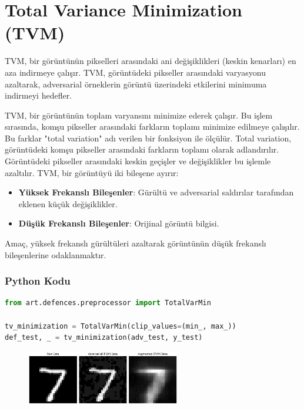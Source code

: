 \section{Total Variance Minimization (TVM)}

TVM, bir görüntünün pikselleri arasındaki ani değişiklikleri (keskin kenarları) en aza indirmeye çalışır. TVM, görüntüdeki pikseller arasındaki varyasyonu azaltarak, adversarial örneklerin görüntü üzerindeki etkilerini minimuma indirmeyi hedefler. 

TVM, bir görüntünün toplam varyansını minimize ederek çalışır. Bu işlem sırasında, komşu pikseller arasındaki farkların toplamı minimize edilmeye çalışılır. Bu farklar "total variation" adı verilen bir fonksiyon ile ölçülür. Total variation, görüntüdeki komşu pikseller arasındaki farkların toplamı olarak adlandırılır. Görüntüdeki pikseller arasındaki keskin geçişler ve değişiklikler bu işlemle azaltılır. TVM, bir görüntüyü iki bileşene ayırır:

\begin{itemize}
    \item \textbf{Yüksek Frekanslı Bileşenler}: Gürültü ve adversarial saldırılar tarafından eklenen küçük değişiklikler.
    \item \textbf{Düşük Frekanslı Bileşenler}: Orijinal görüntü bilgisi.
\end{itemize}

Amaç, yüksek frekanslı gürültüleri azaltarak görüntünün düşük frekanslı bileşenlerine odaklanmaktır.

\subsubsection{Python Kodu}

\begin{lstlisting}[language=Python]
from art.defences.preprocessor import TotalVarMin

tv_minimization = TotalVarMin(clip_values=(min_, max_))
def_test, _ = tv_minimization(adv_test, y_test)
\end{lstlisting}

\begin{figure}[h]
    \centering
    \includegraphics[width=0.6\textwidth]{images/tvm_example.png}
    \caption{}
\end{figure}

\newpage